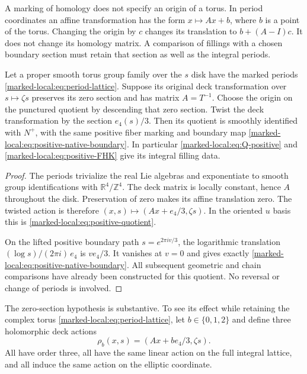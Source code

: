 A marking of homology does not specify an origin of a torus.
In period coordinates an affine transformation has the form
$x\mapsto Ax+b$, where $b$ is a point of the torus. Changing the
origin by $c$ changes its translation to $b+(A-I)c$.
It does not change its homology matrix. A comparison of fillings
with a chosen boundary section must retain that section as well
as the integral periods.

\begin{proposition}\label{marked-local:prop:marked-comparison}
Let a proper smooth torus group family over the $s$ disk have
the marked periods \eqref{marked-local:eq:period-lattice}. Suppose its original deck transformation over $s\mapsto\zeta s$
preserves its zero section and has matrix $A=T^{-1}$.
Choose the origin on the punctured quotient by descending that zero section. Twist the
deck transformation by the section $e_4(s)/3$. Then its quotient
is smoothly identified with $N^+$, with the same positive fiber
marking and boundary map \eqref{marked-local:eq:positive-native-boundary}.
In particular \eqref{marked-local:eq:Q-positive} and
\eqref{marked-local:eq:positive-FHK} give its integral filling data.
\end{proposition}

\begin{proof}
The periods trivialize the real Lie algebras and exponentiate to
smooth group identifications with $\mathbb R^4/\mathbb Z^4$.
The deck matrix is locally constant, hence $A$ throughout the disk.
Preservation of zero makes its affine translation zero. The twisted
action is therefore $(x,s)\mapsto(Ax+e_4/3,\zeta s)$.
In the oriented $u$ basis this is \eqref{marked-local:eq:positive-quotient}.

On the lifted positive boundary path $s=e^{2\pi iv/3}$,
the logarithmic translation
$(\log s)/(2\pi i)\,e_4$ is $ve_4/3$. It vanishes at $v=0$
and gives exactly \eqref{marked-local:eq:positive-native-boundary}.
All subsequent geometric and chain comparisons have already been
constructed for this quotient. No reversal or change of periods is
involved.
\end{proof}

The zero-section hypothesis is substantive. To see its effect while
retaining the complex torus \eqref{marked-local:eq:period-lattice}, let
$b\in\{0,1,2\}$ and define three holomorphic deck actions
\begin{equation}\label{marked-local:eq:affine-ambiguity}
 \rho_b(x,s)=(Ax+be_4/3,\zeta s).
\end{equation}
All have order three, all have the same linear action on the full
integral lattice, and all induce the same action on the elliptic
coordinate.

